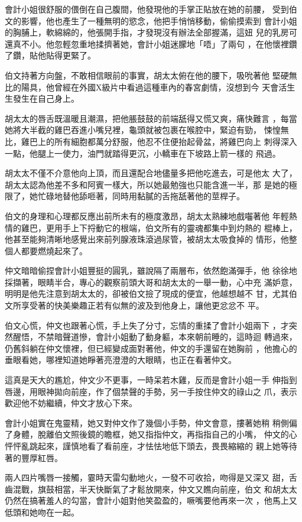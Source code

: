 會計小姐很舒服的偎倒在自己腹間，他發現他的手掌正貼放在她的前腰，
受到伯文的影響，他也產生了一種無明的慾念，他把手悄悄移動，偷偷摸索到
會計小姐的胸脯上，軟綿綿的，他張開手指，才發現沒有辦法全部握滿，這妞
兒的乳房可還真不小。他忽輕忽重地揉擠著她，會計小姐迷朦地「唔」了兩句
，在他懷裡鑽了鑽，貼他貼得更緊了。

伯文持著方向盤，不敢相信眼前的事實，胡太太俯在他的腰下，吸吮著他
堅硬無比的陽具，他曾經在外國X級片中看過這種車內的春宮劇情，沒想到今
天會活生生發生在自己身上。

胡太太的唇舌既溫暖且潮濕，把他脹鼓鼓的前端舐得又慌又爽，痛快難言
，每當她將大半截的雞巴吞進小嘴兒裡，龜頭就被包裹在喉腔中，緊迫有勁，
悚惶無比，雞巴上的所有細胞都萬分舒服，他忍不住便抬起骨盆，將雞巴向上
刺得深入一點，他腿上一使力，油門就踏得更沉，小轎車在下坡路上箭一樣的
飛過。

胡太太不僅不介意他向上頂，而且還配合地儘量多把他吃進去，可是他太
大了，胡太太認為他差不多和阿賓一樣大，所以她最勉強也只能含進一半，那
是她的極限了，她忙碌地替他舔咂著，同時用黏膩的舌拖舐著他的莖桿子。

伯文的身理和心理都反應出前所未有的極度激昂，胡太太熟練地戲囓著他
年輕熱情的雞巴，更用手上下捋動它的根端，伯文所有的靈魂都集中到灼熱的
棍棒上，他甚至能夠清晰地感覺出來前列腺液珠滾過尿管，被胡太太吸食掉的
情形，他整個人都要燃燒起來了。

仲文暗暗偷捏會計小姐豐挺的圓乳，雖說隔了兩層布，依然飽滿彈手，他
徐徐地採擷著，眼睛半合，專心的觀察前頭大哥和胡太太的一舉一動，心中充
滿妒意，明明是他先注意到胡太太的，卻被伯文撿了現成的便宜，他越想越不
甘，尤其伯文所享受著的快美樂趣正若有似無的波及到他身上，讓他更忿忿不
平。

伯文心慌，仲文也跟著心慌，手上失了分寸，忘情的重揉了會計小姐兩下
，才突然醒悟，不禁暗聲道慘，會計小姐動了動身軀，本來朝前睡的，這時迴
轉過來，仍舊斜躺在仲文懷裡，但已經變成面對著他，仲文的手還留在她胸前
，他擔心的垂眼看她，哪裡知道她睜著亮澄澄的大眼睛，也正在看著仲文。

這真是天大的尷尬，仲文少不更事，一時呆若木雞，反而是會計小姐一手
伸指到唇邊，用眼神拋向前座，作了個禁聲的手勢，另一手按住仲文的祿山之
爪，表示歡迎他不妨繼續，仲文才放心下來。

會計小姐實在鬼靈精，她又對仲文作了幾個小手勢，仲文會意，摟著她稍
稍側偏了身體，脫離伯文照後鏡的瞻框，她又指指仲文，再指指自己的小嘴，
仲文的心怦怦亂跳起來，謹慎地看了看前座，才怯怯地低下頭去，畏畏縮縮的
親上她等待著的豐厚紅唇。

兩人四片嘴唇一接觸，霎時天雷勾動地火，一發不可收拾，吻得是又深又
甜，舌齒混戰，旗鼓相當，半天快斷氣了才鬆放開來，仲文又瞧向前座，伯文
和胡太太仍然在搞著羞人的勾當，會計小姐對他笑盈盈的，噘嘴要他再來一次
，他馬上又低頭和她吻在一起。

